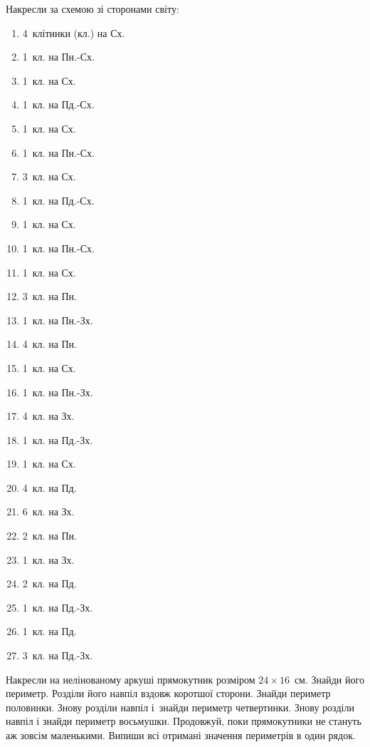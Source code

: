 \problem
Накресли за схемою зі сторонами світу:
\begin{multicols}{2}
    \begin{enumerate}
        \item 4~клітинки (кл.) на Сх.
        \item 1~кл. на Пн.-Сх.
        \item 1~кл. на Сх.
        \item 1~кл. на Пд.-Сх.
        \item 1~кл. на Сх.
        \item 1~кл. на Пн.-Сх.
        \item 3~кл. на Сх.
        \item 1~кл. на Пд.-Сх.
        \item 1~кл. на Сх.
        \item 1~кл. на Пн.-Сх.
        \item 1~кл. на Сх.
        \item 3~кл. на Пн.
        \item 1~кл. на Пн.-Зх.
        \item 4~кл. на Пн.
        \item 1~кл. на Сх.
        \item 1~кл. на Пн.-Зх.
        \item 4~кл. на Зх.
        \item 1~кл. на Пд.-Зх.
        \item 1~кл. на Сх.
        \item 4~кл. на Пд.
        \item 6~кл. на Зх.
        \item 2~кл. на Пн.
        \item 1~кл. на Зх.
        \item 2~кл. на Пд.
        \item 1~кл. на Пд.-Зх.
        \item 1~кл. на Пд.
        \item 3~кл. на Пд.-Зх.
    \end{enumerate}
\end{multicols}


\problem
Накресли на нелінованому аркуші прямокутник розміром $24\times16$~см.
Знайди його периметр.
Розділи його навпіл вздовж коротшої сторони.
Знайди периметр половинки.
Знову розділи навпіл і~знайди периметр четвертинки.
Знову розділи навпіл і знайди периметр восьмушки.
Продовжуй, поки прямокутники не стануть аж зовсім маленькими.
Випиши всі отримані значення периметрів в один рядок.


